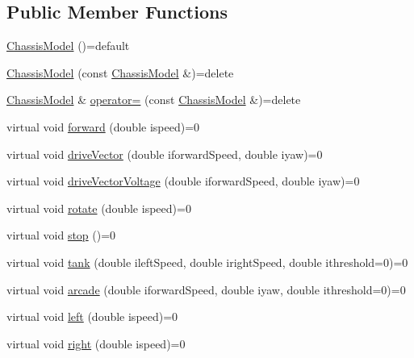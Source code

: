 \subsection*{Public Member Functions}
\begin{DoxyCompactItemize}
\item 
\mbox{\hyperlink{classokapi_1_1ChassisModel_ae292afae5511e46eec17cf0f9bad1bb6}{Chassis\+Model}} ()=default
\item 
\mbox{\hyperlink{classokapi_1_1ChassisModel_a8201eb131b58c99a2b93630758e8367d}{Chassis\+Model}} (const \mbox{\hyperlink{classokapi_1_1ChassisModel}{Chassis\+Model}} \&)=delete
\item 
\mbox{\hyperlink{classokapi_1_1ChassisModel}{Chassis\+Model}} \& \mbox{\hyperlink{classokapi_1_1ChassisModel_ab6c89183b8a5317a1e149df5ed22dfb1}{operator=}} (const \mbox{\hyperlink{classokapi_1_1ChassisModel}{Chassis\+Model}} \&)=delete
\item 
virtual void \mbox{\hyperlink{classokapi_1_1ChassisModel_ae39e8ccd15b6f84e32cd21fe99bdd6c9}{forward}} (double ispeed)=0
\item 
virtual void \mbox{\hyperlink{classokapi_1_1ChassisModel_aa621ce62c2bc336e41b859e2cb10dda5}{drive\+Vector}} (double iforward\+Speed, double iyaw)=0
\item 
virtual void \mbox{\hyperlink{classokapi_1_1ChassisModel_a69115758be9e29888dce34f317d57150}{drive\+Vector\+Voltage}} (double iforward\+Speed, double iyaw)=0
\item 
virtual void \mbox{\hyperlink{classokapi_1_1ChassisModel_af13aa5281c762eb61a444f0b35176014}{rotate}} (double ispeed)=0
\item 
virtual void \mbox{\hyperlink{classokapi_1_1ChassisModel_ad67ad9abae41c5441c2a2d671d0c8a55}{stop}} ()=0
\item 
virtual void \mbox{\hyperlink{classokapi_1_1ChassisModel_a185a667048f84c3a0fced6882c5f7980}{tank}} (double ileft\+Speed, double iright\+Speed, double ithreshold=0)=0
\item 
virtual void \mbox{\hyperlink{classokapi_1_1ChassisModel_a632d4c0b74747ab3b9c5a159a36bdd03}{arcade}} (double iforward\+Speed, double iyaw, double ithreshold=0)=0
\item 
virtual void \mbox{\hyperlink{classokapi_1_1ChassisModel_aa2008856c169eb64c6648bc64c31c504}{left}} (double ispeed)=0
\item 
virtual void \mbox{\hyperlink{classokapi_1_1ChassisModel_a282fcf947aea9630cadd2c673eb5f7e3}{right}} (double ispeed)=0
\item 

\end{DoxyCompactItemize}
